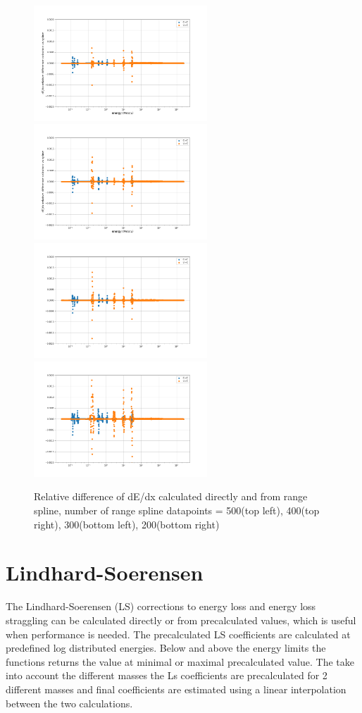 \documentclass[12pt,a4paper]{article}
\begin{document}
\begin{figure}[h]
	\centering
    \includegraphics[width=6.5cm]{plots/dedx_difs_n500.png}
   	\includegraphics[width=6.5cm]{plots/dedx_difs_n400.png}
   	\includegraphics[width=6.5cm]{plots/dedx_difs_n300.png}
   	\includegraphics[width=6.5cm]{plots/dedx_difs_n200.png}
	\caption{Relative difference of dE/dx calculated directly and from range spline, number of range spline datapoints = 500(top left), 400(top right), 300(bottom left), 200(bottom right)}
\end{figure}	


\section{Lindhard-Soerensen}
The Lindhard-Soerensen (LS) corrections to energy loss and energy loss straggling can be calculated directly or from precalculated values, which is useful when performance is needed. The precalculated LS coefficients are calculated at predefined log distributed energies. Below and above the energy limits the functions returns the value at minimal or maximal precalculated value. The take into account the different masses the Ls coefficients are precalculated for 2 different masses and final coefficients are estimated using a linear interpolation between the two calculations.
\end{document}
